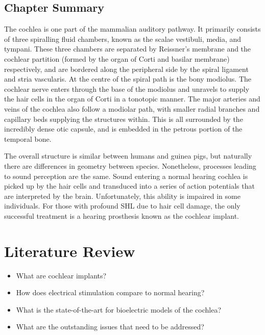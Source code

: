 \section{Chapter Summary}

The cochlea is one part of the mammalian auditory pathway. It primarily consists
of three spiralling fluid chambers, known as the scalae vestibuli, media, and
tympani. These three chambers are separated by Reissner's membrane and the
cochlear partition (formed by the organ of Corti and basilar membrane)
respectively, and are bordered along the peripheral side by the spiral ligament
and stria vascularis. At the centre of the spiral path is the bony modiolus. The
cochlear nerve enters through the base of the modiolus and unravels to supply
the hair cells in the organ of Corti in a tonotopic manner. The major arteries
and veins of the cochlea also follow a modiolar path, with smaller radial
branches and capillary beds supplying the structures within. This is all
surrounded by the incredibly dense otic capsule, and is embedded in the petrous
portion of the temporal bone.

The overall structure is similar between humans and guinea pigs, but naturally
there are differences in geometry between species. Nonetheless, processes
leading to sound perception are the same. Sound entering a normal hearing
cochlea is picked up by the hair cells and transduced into a series of action
potentials that are interpreted by the brain. Unfortunately, this ability is
impaired in some individuals. For those with profound SHL due to hair cell
damage, the only successful treatment is a hearing prosthesis known as the
cochlear implant.

\clearpage


	\pagestyle{fancy}
	\lhead{{\sffamily \MakeUppercase\leftmark}}
	\chead{}
	\rhead{{\sffamily \MakeUppercase\rightmark}}
	\lfoot{}
	\cfoot{{\sffamily \thepage}}
	\rfoot{}

\chapter{Literature Review}

\begin{center}
	\begin{tcolorbox}[title=\boxtitle]
		\begin{itemize}[leftmargin=*,labelindent=2ex,labelsep=1.5ex,itemsep=0pt,parsep=0pt]
		    \item What are cochlear implants?
			\item How does electrical stimulation compare to normal hearing?
			\item What is the state-of-the-art for bioelectric models of the cochlea?
			\item What are the outstanding issues that need to be addressed?
		\end{itemize}
	\end{tcolorbox}
\end{center}

